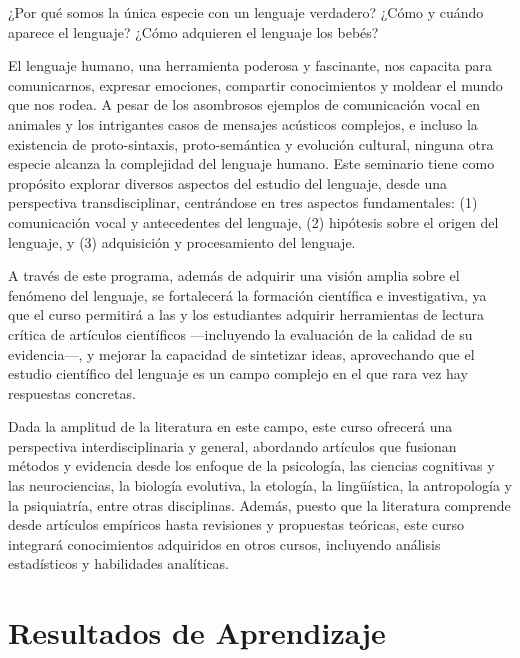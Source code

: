 \documentclass[11pt,a4paper,]{awesome-cv}
\begin{document}
\begin{footnotesize}
¿Por qué somos la única especie con un lenguaje verdadero? ¿Cómo y cuándo aparece el lenguaje? ¿Cómo adquieren el lenguaje los bebés? 

El lenguaje humano, una herramienta poderosa y fascinante, nos capacita para comunicarnos, expresar emociones, compartir conocimientos y moldear el mundo que nos rodea. A pesar de los asombrosos ejemplos de comunicación vocal en animales y los intrigantes casos de mensajes acústicos complejos, e incluso la existencia de proto-sintaxis, proto-semántica y evolución cultural, ninguna otra especie alcanza la complejidad del lenguaje humano. 
Este seminario tiene como propósito explorar diversos aspectos del estudio del lenguaje, desde una perspectiva transdisciplinar, centrándose en tres aspectos fundamentales: (1) comunicación vocal y antecedentes del lenguaje, (2) hipótesis sobre el origen del lenguaje, y (3) adquisición y procesamiento del lenguaje.

A través de este programa, además de adquirir una visión amplia sobre el fenómeno del lenguaje, se fortalecerá la formación científica e investigativa, ya que el curso permitirá a las y los estudiantes adquirir herramientas de lectura crítica de artículos científicos —incluyendo la evaluación de la calidad de su evidencia—, y mejorar la capacidad de sintetizar ideas, aprovechando que el estudio científico del lenguaje es un campo complejo en el que rara vez hay respuestas concretas. 

Dada la amplitud de la literatura en este campo, este curso ofrecerá una perspectiva interdisciplinaria y general, abordando artículos que fusionan métodos y evidencia desde los enfoque de la psicología, las ciencias cognitivas y las neurociencias, la biología evolutiva, la etología, la lingüística, la antropología y la psiquiatría, entre otras disciplinas. Además, puesto que la literatura comprende desde artículos empíricos hasta revisiones y propuestas teóricas, este curso integrará conocimientos adquiridos en otros cursos, incluyendo análisis estadísticos y habilidades analíticas.
\end{footnotesize}

\hypertarget{resultados-de-aprendizaje}{%
\section{Resultados de Aprendizaje}\label{resultados-de-aprendizaje}}
\end{document}
